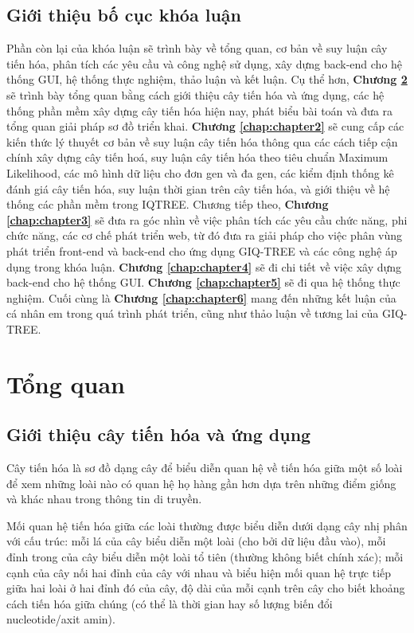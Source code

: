 \documentclass[12pt]{report}
\begin{document}
\section{Giới thiệu bố cục khóa luận}
Phần còn lại của khóa luận sẽ trình bày về tổng quan, cơ bản về suy luận cây tiến hóa, phân tích các yêu cầu và công nghệ sử dụng, xây dựng back-end cho hệ thống GUI, hệ thống thực nghiệm, thảo luận và kết luận. Cụ thể hơn, \textbf{Chương \ref{chap:chapter1}} sẽ trình bày tổng quan bằng cách giới thiệu cây tiến hóa và ứng dụng, các hệ thống phần mềm xây dựng cây tiến hóa hiện nay, phát biểu bài toán và đưa ra tổng quan giải pháp sơ đồ triển khai. \textbf{Chương \ref{chap:chapter2}} sẽ cung cấp các kiến thức lý thuyết cơ bản về suy luận cây tiến hóa thông qua các cách tiếp cận chính xây dựng cây tiến hoá, suy luận cây tiến hóa theo tiêu chuẩn Maximum Likelihood, các mô hình dữ liệu cho đơn gen và đa gen, các kiểm định thống kê đánh giá cây tiến hóa, suy luận thời gian trên cây tiến hóa, và giới thiệu về hệ thống các phần mềm trong IQTREE.
Chương tiếp theo, \textbf{Chương \ref{chap:chapter3}} sẽ đưa ra góc nhìn về việc phân tích các yêu cầu chức năng, phi chức năng, các cơ chế phát triển web, từ đó đưa ra giải pháp cho việc phân vùng phát triển front-end và back-end cho ứng dụng GIQ-TREE và các công nghệ áp dụng trong khóa luận.	\textbf{Chương \ref{chap:chapter4}} sẽ đi chi tiết về việc xây dựng back-end cho hệ thống GUI. \textbf{Chương \ref{chap:chapter5}} sẽ đi qua hệ thống thực nghiệm. Cuối cùng là \textbf{Chương \ref{chap:chapter6}} mang đến những kết luận của cá nhân em trong quá trình phát triển, cũng như thảo luận về tương lai của GIQ-TREE.
\newpage	
\chapter{Tổng quan}
\label{chap:chapter1}
\section{Giới thiệu cây tiến hóa và ứng dụng}
Cây tiến hóa là sơ đồ dạng cây để biểu diễn quan hệ về tiến hóa giữa một số loài để xem những loài nào có quan hệ họ hàng gần hơn \cite{cia-0} \cite{cia-1}  dựa trên những điểm giống và khác nhau trong thông tin di truyền.

Mối quan hệ tiến hóa giữa các loài thường được biểu diễn dưới dạng cây nhị phân với cấu trúc: mỗi lá của cây biểu diễn một loài (cho bởi dữ liệu đầu vào), mỗi đỉnh trong của cây biểu diễn một loài tổ tiên (thường không biết chính xác); mỗi cạnh của cây nối hai đỉnh của cây với nhau và biểu hiện mối quan hệ trực tiếp giữa hai loài ở hai đỉnh đó của cây, độ dài của mỗi cạnh trên cây cho biết khoảng cách tiến hóa giữa chúng (có thể là thời gian hay số lượng biến đổi nucleotide/axit amin).
\end{document}
